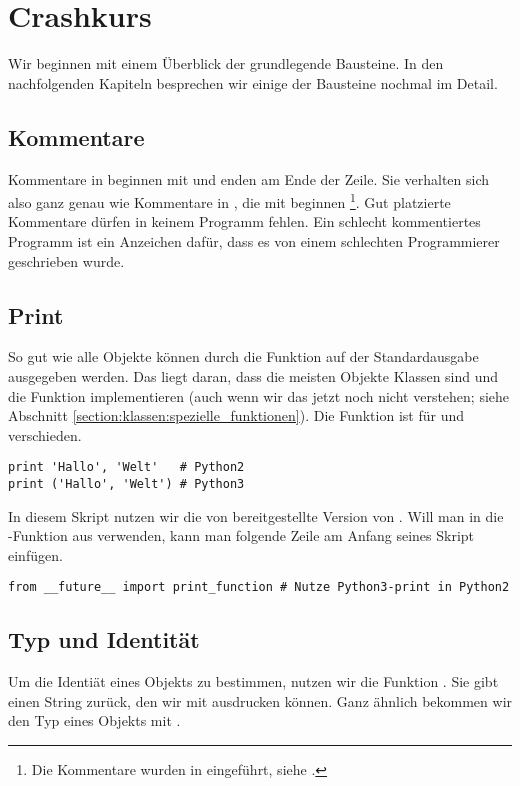 \section{Crashkurs}
\label{section:crashkurs}
Wir beginnen mit einem Überblick der grundlegende Bausteine.
In den nachfolgenden Kapiteln besprechen wir einige der Bausteine nochmal im Detail.


\subsection{Kommentare}
\label{section:crashkurs:kommentare}
Kommentare in \Python beginnen mit \lpy{#} und enden am Ende der Zeile.
Sie verhalten sich also ganz genau wie Kommentare in \CC, die mit \lcpp{//} beginnen%
\footnote{Die Kommentare \lcpp{//} wurden in \CNeunundneunzig eingeführt, siehe \cite{C99}.}.
Gut platzierte Kommentare dürfen in keinem Programm fehlen.
Ein schlecht kommentiertes Programm ist ein Anzeichen dafür, dass es von einem schlechten Programmierer geschrieben wurde.


\subsection{Print}
\label{section:crashkurs:print}
So gut wie alle Objekte können durch die \Python Funktion  auf der Standardausgabe ausgegeben werden.
Das liegt daran, dass die meisten Objekte Klassen sind und die Funktion  implementieren (auch wenn wir das jetzt noch nicht verstehen;
siehe Abschnitt \ref{section:klassen:spezielle_funktionen}).
Die Funktion  ist für \PythonZwei und \PythonDrei verschieden.
\begin{lstlisting}
print 'Hallo', 'Welt'   # Python2
print ('Hallo', 'Welt') # Python3
\end{lstlisting}
In diesem Skript nutzen wir die von \PythonDrei bereitgestellte Version von .
Will man in \PythonZwei die -Funktion aus \PythonDrei verwenden, kann man folgende Zeile am Anfang seines Skript einfügen.
\begin{lstlisting}
from __future__ import print_function # Nutze Python3-print in Python2
\end{lstlisting}


\subsection{Typ und Identität}
\label{section:crashkurs:typ_und_id}
Um die Identiät eines Objekts  zu bestimmen, nutzen wir die Funktion .
Sie gibt einen String zurück, den wir mit  ausdrucken können.
Ganz ähnlich bekommen wir den Typ eines Objekts mit .


